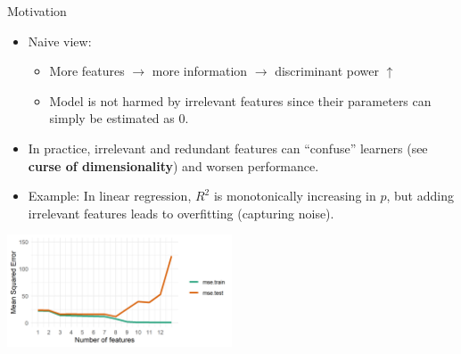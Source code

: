 \documentclass[11pt,compress,t,notes=noshow, xcolor=table]{beamer}
\begin{document}
  \begin{vbframe}{Motivation}
    \begin{itemize}
    \setlength{\itemsep}{0.8em}
      \item Naive view:
        \begin{itemize}
          \item More features $\rightarrow$ more information $\rightarrow$ discriminant power $\uparrow$
          \item Model is not harmed by irrelevant features since their parameters can simply be estimated as 0.
        \end{itemize}
     \item In practice, irrelevant and redundant features can \enquote{confuse} learners (see \textbf{curse of dimensionality}) and worsen performance.
     \item Example: In linear regression, $R^2$ is monotonically increasing in $p$, but adding irrelevant features leads to overfitting (capturing noise). %
  \end{itemize}

  \begin{center}
     \includegraphics[width = 0.5\textwidth]{slides/feature-selection/figure_man/avoid_overfitting_02.png}\\
    \end{center}

  \framebreak


\end{vbframe}
\end{document}
